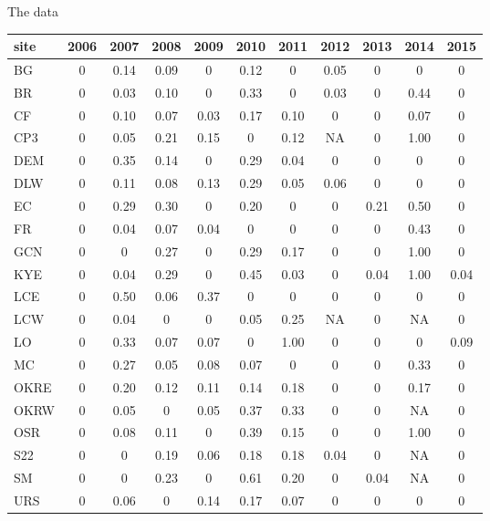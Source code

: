 \documentclass[12pt, oneside, titlepage]{article}   	%
\begin{document}
The data 
 
 \newpage
 
  \label{tab:undercount} 
\begin{table}[ht]
\centering
\begin{tabular}{lcccccccccc}
  \hline
site & 2006 & 2007 & 2008 & 2009 & 2010 & 2011 & 2012 & 2013 & 2014 & 2015 \\ 
  \hline
BG & 0 & 0.14 & 0.09 & 0 & 0.12 & 0 & 0.05 & 0 & 0 & 0 \\ 
  BR & 0 & 0.03 & 0.10 & 0 & 0.33 & 0 & 0.03 & 0 & 0.44 & 0 \\ 
  CF & 0 & 0.10 & 0.07 & 0.03 & 0.17 & 0.10 & 0 & 0 & 0.07 & 0 \\ 
  CP3 & 0 & 0.05 & 0.21 & 0.15 & 0 & 0.12 & NA & 0 & 1.00 & 0 \\ 
  DEM & 0 & 0.35 & 0.14 & 0 & 0.29 & 0.04 & 0 & 0 & 0 & 0 \\ 
  DLW & 0 & 0.11 & 0.08 & 0.13 & 0.29 & 0.05 & 0.06 & 0 & 0 & 0 \\ 
  EC & 0 & 0.29 & 0.30 & 0 & 0.20 & 0 & 0 & 0.21 & 0.50 & 0 \\ 
  FR & 0 & 0.04 & 0.07 & 0.04 & 0 & 0 & 0 & 0 & 0.43 & 0 \\ 
  GCN & 0 & 0 & 0.27 & 0 & 0.29 & 0.17 & 0 & 0 & 1.00 & 0 \\ 
  KYE & 0 & 0.04 & 0.29 & 0 & 0.45 & 0.03 & 0 & 0.04 & 1.00 & 0.04 \\ 
  LCE & 0 & 0.50 & 0.06 & 0.37 & 0 & 0 & 0 & 0 & 0 & 0 \\ 
  LCW & 0 & 0.04 & 0 & 0 & 0.05 & 0.25 & NA & 0 & NA & 0 \\ 
  LO & 0 & 0.33 & 0.07 & 0.07 & 0 & 1.00 & 0 & 0 & 0 & 0.09 \\ 
  MC & 0 & 0.27 & 0.05 & 0.08 & 0.07 & 0 & 0 & 0 & 0.33 & 0 \\ 
  OKRE & 0 & 0.20 & 0.12 & 0.11 & 0.14 & 0.18 & 0 & 0 & 0.17 & 0 \\ 
  OKRW & 0 & 0.05 & 0 & 0.05 & 0.37 & 0.33 & 0 & 0 & NA & 0 \\ 
  OSR & 0 & 0.08 & 0.11 & 0 & 0.39 & 0.15 & 0 & 0 & 1.00 & 0 \\ 
  S22 & 0 & 0 & 0.19 & 0.06 & 0.18 & 0.18 & 0.04 & 0 & NA & 0 \\ 
  SM & 0 & 0 & 0.23 & 0 & 0.61 & 0.20 & 0 & 0.04 & NA & 0 \\ 
  URS & 0 & 0.06 & 0 & 0.14 & 0.17 & 0.07 & 0 & 0 & 0 & 0 \\ 
    \hline
\end{tabular}
\end{table}
 
\end{document}
